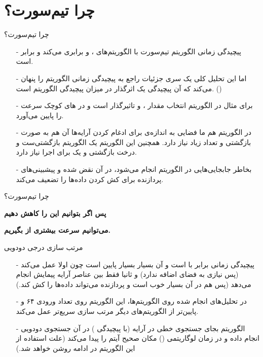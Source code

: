 \section{چرا تیم‌سورت؟}
\begin{frame}{چرا تیم‌سورت؟}
\begin{itemize}\itemr
\item[-]
پیچیدگی زمانی الگوریتم تیم‌سورت با الگوریتم‌های 
،
 و
برابری می‌کند و برابر 
است.

\item[-]
اما این تحلیل کلی یک سری جزئیات راجع به پیچیدگی زمانی الگوریتم را پنهان می‌کند که آن پیچیدگی یک 
اثرگذار در میزان پیچیدگی الگوریتم است. ()

\item[-]
برای مثال در الگوریتم  انتخاب مقدار 
،
 و
تاثیرگذار است و در های کوچک سرعت را پایین می‌آورد.

\item[-]
در الگوریتم 
هم ما فضایی به اندازه‌ی  برای ادغام کردن آرایه‌ها آن هم به صورت بازگشتی و تعداد زیاد نیاز دارد. همچنین این الگوریتم یک الگوریتم بازگشتی‌ست و درخت بازگشتی و یک  برای اجرا نیاز دارد.

\item[-]
بخاطر جابجایی‌هایی در الگوریتم  انجام می‌شود، 
در آن نقض شده و پیشبینی‌های پردازنده‌ برای کش کردن داده‌ها را تضعیف می‌کند.
\end{itemize}
\end{frame}

\begin{frame}{چرا تیم‌سورت؟}
\begin{center}
{\Large \textbf{پس اگر بتوانیم این  را کاهش دهیم}}

{\Large \textbf{می‌توانیم سرعت بیشتری از  بگیریم.}}
\end{center}
\end{frame}

\begin{frame}{مرتب سازی درجی دودویی}
\begin{itemize}\itemr
\item[-]
پیچیدگی زمانی  برابر با 
است و 
آن بسیار بسیار پایین است چون اولا  عمل می‌کند (پس نیازی به فضای اضافه ندارد) و ثانیا فقط بین عناصر آرایه پیمایش انجام می‌دهد (پس  هم در آن بسیار خوب است و پردازنده می‌تواند داده‌ها را کش کند.)

\item[-]
در تحلیل‌های انجام شده روی الگوریتم‌ها، این الگوریتم روی تعداد ورودی ۶۴ و پایین‌تر از الگوریتم‌های دیگر مرتب سازی سریع‌تر عمل می‌‌کند.

\item[-]
الگوریتم 
بجای جستجوی خطی در آرایه (با پیچیدگی ) در آن جستجوی دودویی انجام داده و در زمان لوگاریتمی () مکان صحیح آیتم را پیدا می‌‌کند (علت استفاده از این الگوریتم در ادامه روشن خواهد شد.)
\end{itemize}
\end{frame}
